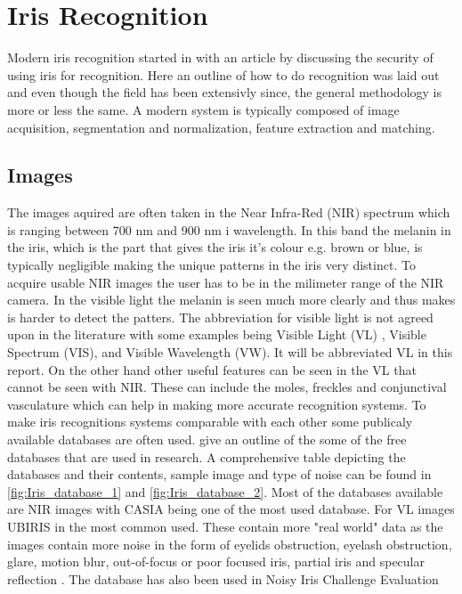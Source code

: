 \section{Iris Recognition}
\label{sec:Iris_Recognition_Research}
Modern iris recognition started in with an article by \cite{Daugman1993} discussing the security of using iris for recognition. Here an outline of how to do recognition was laid out and even though the field has been  extensivly since, the general methodology is more or less the same. A modern system is typically composed of image acquisition, segmentation and normalization, feature extraction and matching. 

\subsection{Images}
The images aquired are often taken in the Near Infra-Red (NIR) spectrum which is ranging between 700 nm and 900 nm i wavelength. In this band the melanin in the iris, which is the part that gives the iris it's colour e.g. brown or blue, is typically negligible making the unique patterns in the iris very distinct. To acquire usable NIR images the user has to be in the milimeter range of the NIR camera.  In the visible light the melanin is seen much more clearly and thus makes is harder to detect the patters. The abbreviation for visible light is not agreed upon in the literature with some examples being Visible Light (VL) , Visible Spectrum (VIS), and Visible Wavelength (VW). It will be abbreviated VL  in this report. On the other hand other useful features can be seen in the VL that cannot be seen with NIR. These can include the moles, freckles and conjunctival vasculature which can help in making more accurate recognition systems. To make iris recognitions systems comparable with each other some publicaly available databases are often used. \cite{RifaeeMustafaandAbdallahMohammadandOkosh2017}  give an outline of the some of the free databases that are used in research. A comprehensive table depicting the databases and their contents, sample image and type of noise can be found in \autoref{fig:Iris_database_1} and \autoref{fig:Iris_database_2}. Most of the databases available are NIR images with CASIA being one of the most used database. For VL images UBIRIS in the most common used.  These contain more "real world" data as the images contain more noise in the form of eyelids obstruction, eyelash obstruction, glare, motion blur, out-of-focus or poor focused iris, partial iris and specular reflection \citep{Rattani2017}. The database has also been used in Noisy Iris Challenge Evaluation 
